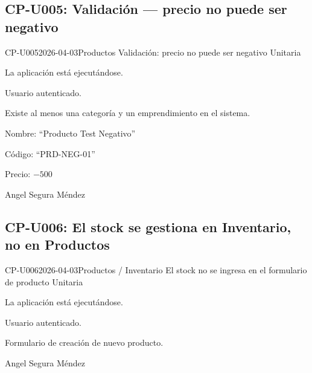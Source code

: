 \subsection{CP-U005: Validación --- precio no puede ser negativo}
\def\cpPasos{%
  \item Navegar a ``Productos''.
  \item Hacer clic en nuevo producto.
  \item Ingresar nombre, código y precio $-500$.
  \item Intentar guardar.}
\def\cpResultadoE{%
  \item El sistema rechaza el precio negativo con un mensaje de error.}
\def\cpResultadoO{El sistema mostró el mensaje: ``intenta agregar un precio de venta válido''.
  No se guardó el producto.}
\casoprueba
  {CP-U005}{2026-04-03}{Productos}
  {Validación: precio no puede ser negativo}
  {Unitaria}{\estadoAprobado}
  {\item La aplicación está ejecutándose.
   \item Usuario autenticado.
   \item Existe al menos una categoría y un emprendimiento en el sistema.}
  {\item Nombre: ``Producto Test Negativo''
   \item Código: ``PRD-NEG-01''
   \item Precio: $-500$}
  {Angel Segura Méndez}

\subsection{CP-U006: El stock se gestiona en Inventario, no en Productos}
\def\cpPasos{%
  \item Navegar a ``Productos'' \arr{} Nuevo producto.
  \item Observar los campos disponibles en el formulario.}
\def\cpResultadoE{%
  \item Exploración del diseño del módulo.}
\def\cpResultadoO{El formulario de productos no incluye campo de stock. El stock se
  administra en el módulo de \textbf{Inventario} mediante movimientos. Corresponde a
  un diseño correcto: el stock se controla mediante entradas y salidas, no editándolo
  directamente.}
\casoprueba
  {CP-U006}{2026-04-03}{Productos / Inventario}
  {El stock no se ingresa en el formulario de producto}
  {Unitaria}{\estadoObs}
  {\item La aplicación está ejecutándose.
   \item Usuario autenticado.}
  {\item Formulario de creación de nuevo producto.}
  {Angel Segura Méndez}

